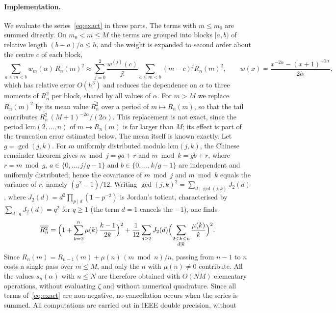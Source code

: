 \documentclass[11pt]{extarticle}
\numberwithin{equation}{section}
\theoremstyle{plain}
\theoremstyle{remark}
\begin{document}
\paragraph{Implementation.}
We evaluate the series~\eqref{eq:exact} in three parts. The terms with $m \leq m_0$ are
summed directly. On $m_0 < m \leq M$ the terms are grouped into blocks $[a, b)$ of
relative length $(b-a)/a \leq h$, and the weight is expanded to second order about the
centre $c$ of each block,
\[
\sum_{a \leq m < b} w_m(\alpha)\, R_n(m)^2 \approx
\sum_{j=0}^{2} \frac{w^{(j)}(c)}{j!} \sum_{a \leq m < b} (m - c)^j R_n(m)^2,
\qquad w(x) = \frac{x^{-2\alpha} - (x+1)^{-2\alpha}}{2\alpha},
\]
which has relative error $O(h^3)$ and reduces the dependence on $\alpha$ to three
moments of $R_n^2$ per block, shared by all values of $\alpha$. For $m > M$ we replace
$R_n(m)^2$ by its mean value $\overline{R_n^2}$ over a period of $m \mapsto R_n(m)$, so
that the tail contributes $\overline{R_n^2}\,(M+1)^{-2\alpha}/(2\alpha)$. This
replacement is not exact, since the period $\mathrm{lcm}(2, \dots, n)$ of
$m \mapsto R_n(m)$ is far larger than $M$; its effect is part of the truncation
error estimated below. The mean itself is known exactly. Let $g = \gcd(j,k)$. For $m$ uniformly distributed
modulo $\mathrm{lcm}(j,k)$, the Chinese remainder theorem gives
$m \bmod j = ga + r$ and $m \bmod k = gb + r$, where $r = m \bmod g$,
$a \in \{0, \dots, j/g - 1\}$ and $b \in \{0, \dots, k/g - 1\}$ are independent and
uniformly distributed; hence the covariance of $m \bmod j$ and $m \bmod k$ equals
the variance of $r$, namely $(g^2 - 1)/12$. Writing
$\gcd(j,k)^2 = \sum_{d \mid \gcd(j,k)} J_2(d)$, where
$J_2(d) = d^2 \prod_{p \mid d} (1 - p^{-2})$ is Jordan's totient, characterised by
$\sum_{d \mid q} J_2(d) = q^2$ for $q \geq 1$ \cite[Ch.~2, Exercise~17]{apostol}
(the term $d = 1$ cancels the $-1$), one finds
\[
\overline{R_n^2} = \Bigl(1 + \sum_{k=2}^{n} \mu(k)\,\frac{k-1}{2k}\Bigr)^2
+ \frac{1}{12} \sum_{d \geq 2} J_2(d) \Bigl(\sum_{\substack{2 \leq k \leq n \\ d \mid k}} \frac{\mu(k)}{k}\Bigr)^2 .
\]
Since $R_n(m) = R_{n-1}(m) + \mu(n)\,(m \bmod n)/n$, passing from $n-1$ to $n$ costs a
single pass over $m \leq M$, and only the $n$ with $\mu(n) \neq 0$ contribute. All the
values $s_n(\alpha)$ with $n \leq N$ are therefore obtained with $O(NM)$ elementary
operations, without evaluating $\zeta$ and without numerical quadrature. Since all
terms of~\eqref{eq:exact} are non-negative, no cancellation occurs when the series is
summed. All computations are carried out in IEEE double precision, without
\end{document}
